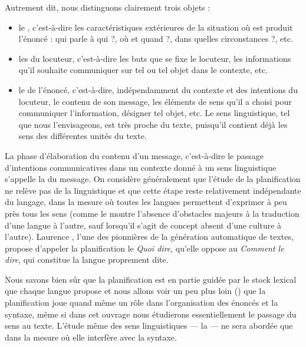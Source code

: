 Autrement dit, nous distinguons clairement trois objets :

\begin{itemize}
\item le , c’est-à-dire les caractéristiques extérieures de la situation où est produit l’énoncé : qui parle à qui ?, où et quand ?, dans quelles circonstances ?, etc.
\item les  du locuteur, c’est-à-dire les buts que se fixe le locuteur, les informations qu’il souhaite communiquer sur tel ou tel objet dans le contexte, etc.
\item le  de l’énoncé, c’est-à-dire, indépendamment du con\-texte et des intentions du locuteur, le contenu de son message, les éléments de sens qu’il a choisi pour communiquer l’information, désigner tel objet, etc. Le sens linguistique, tel que nous l’envisageons, est très proche du texte, puisqu’il contient déjà les sens des différentes unités du texte.
\end{itemize}

La phase d’élaboration du contenu d’un message, c’est-à-dire le passage d’intentions communicatives dans un contexte donné à un sens linguistique s’appelle la  du message. On considère généralement que l’étude de la planification ne relève pas de la linguistique et que cette étape reste relativement indépendante du langage, dans la mesure où toutes les langues permettent d’exprimer à peu près tous les sens (comme le montre l’absence d’obstacles majeurs à la traduction d’une langue à l’autre, sauf lorsqu’il s’agit de concept absent d’une culture à l’autre). Laurence \citet{danlos1987generation}, l’une des pionnières de la génération automatique de textes, propose d’appeler la planification le \textit{Quoi dire}, qu’elle oppose au \textit{Comment le dire}, qui constitue la langue proprement dite.

Nous savons bien sûr que la planification est en partie guidée par le stock lexical que chaque langue propose et nous allons voir un peu plus loin () que la planification joue quand même un rôle dans l’organisation des énoncés et la syntaxe, même si dans cet ouvrage nous étudierons essentiellement le passage du sens au texte. L’étude même des sens linguistiques — la  — ne sera abordée que dans la mesure où elle interfère avec la syntaxe.

